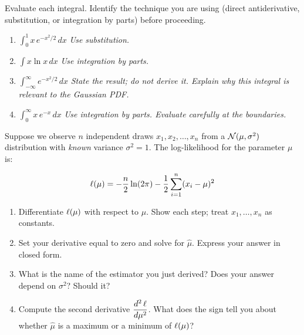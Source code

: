 \documentclass[11pt, letterpaper]{article}
\begin{document}
\vspace{24pt}


\begin{problembox}[title={Problem 2 \hfill $\star$}]
Evaluate each integral. Identify the technique you are using (direct
antiderivative, substitution, or integration by parts) before proceeding.
\end{problembox}

\begin{enumerate}
  \item $\displaystyle\int_0^1 x\, e^{-x^2/2}\, dx$
  \quad \textit{Use substitution.}

  \item $\displaystyle\int x \ln x\, dx$
  \quad \textit{Use integration by parts.}

  \item $\displaystyle\int_{-\infty}^{\infty} e^{-x^2/2}\, dx$
  \quad \textit{State the result; do not derive it. Explain why this integral
  is relevant to the Gaussian PDF.}

  \item $\displaystyle\int_0^{\infty} x\, e^{-x}\, dx$
  \quad \textit{Use integration by parts. Evaluate carefully at the boundaries.}
\end{enumerate}

\vspace{24pt}


\begin{problembox}[title={Problem 3 \hfill $\star\star$}]
Suppose we observe $n$ independent draws $x_1, x_2, \ldots, x_n$ from a
$\mathcal{N}(\mu, \sigma^2)$ distribution with \emph{known} variance $\sigma^2 = 1$.
The log-likelihood for the parameter $\mu$ is:

$$\ell(\mu) = -\frac{n}{2}\ln(2\pi) - \frac{1}{2}\sum_{i=1}^n (x_i - \mu)^2$$
\end{problembox}

\begin{enumerate}
  \item Differentiate $\ell(\mu)$ with respect to $\mu$.
  Show each step; treat $x_1, \ldots, x_n$ as constants.

  \item Set your derivative equal to zero and solve for $\hat{\mu}$.
  Express your answer in closed form.

  \item What is the name of the estimator you just derived?
  Does your answer depend on $\sigma^2$? Should it?

  \item Compute the second derivative $\dfrac{d^2\,\ell}{d\mu^2}$.
  What does the sign tell you about whether $\hat{\mu}$ is a maximum or
  a minimum of $\ell(\mu)$?
\end{enumerate}
\end{document}
